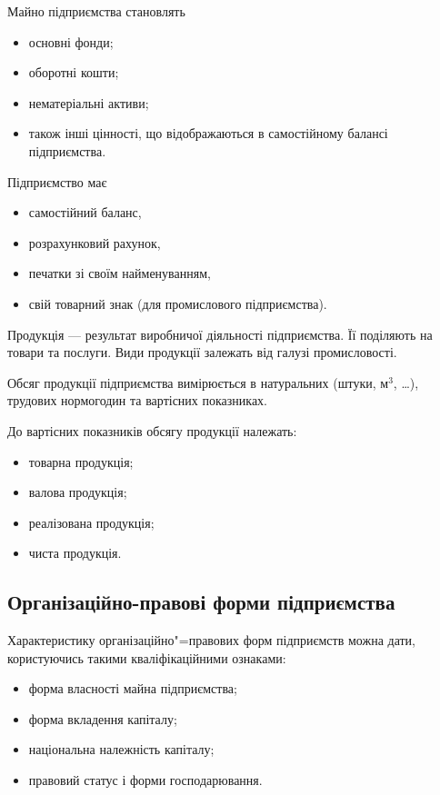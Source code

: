 \documentclass[a5paper,10pt,notitlepage,pdftex,headsepline]{scrartcl}
\begin{document}
  Майно підприємства становлять
  \begin{itemize}
    \item основні фонди;
    \item оборотні кошти;
    \item нематеріальні активи;
    \item також інші цінності, що відображаються в самостійному балансі
      підприємства.
  \end{itemize}

  Підприємство має
  \begin{itemize}
    \item самостійний баланс,
    \item розрахунковий рахунок,
    \item печатки зі своїм найменуванням,
    \item свій товарний знак (для промислового підприємства).
  \end{itemize}

  Продукція --- результат виробничої діяльності підприємства.
  Її поділяють на товари та послуги.
  Види продукції залежать від галузі промисловості.

  Обсяг продукції підприємства вимірюється в натуральних (штуки, м$^3$,
  \ldots), трудових нормогодин та вартісних показниках.

  До вартісних показників обсягу продукції належать:
  \begin{itemize}
    \item товарна продукція;
    \item валова продукція;
    \item реалізована продукція;
    \item чиста продукція.
  \end{itemize}


  \subsection{Організаційно-правові форми підприємства}
  Характеристику організаційно"=правових форм підприємств можна дати,
  користуючись такими кваліфікаційними ознаками:
  \begin{itemize}
    \item форма власності майна підприємства;
    \item форма вкладення капіталу;
    \item національна належність капіталу;
    \item правовий статус і форми господарювання.
  \end{itemize}
\end{document}
